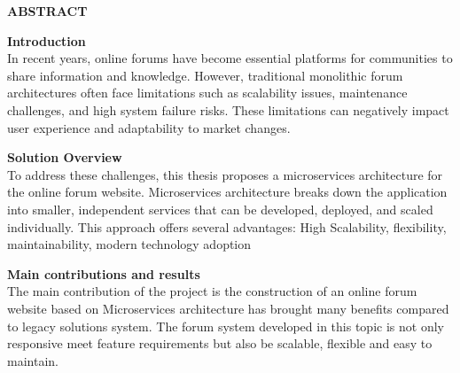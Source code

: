 \documentclass[../index.tex]{subfiles}
\begin{document}
    \newpage
    \begin{center}
        \Large{\textbf{ABSTRACT}}\\
    \end{center}
    \vspace{1cm}

    \textbf{Introduction}\\
    \indent
    In recent years, online forums have become essential platforms for communities
    to share information and knowledge. However, traditional monolithic forum architectures
    often face limitations such as scalability issues, maintenance challenges, and
    high system failure risks. These limitations can negatively impact user
    experience and adaptability to market changes.

    \textbf{Solution Overview}\\
    \indent
    To address these challenges, this thesis proposes a microservices architecture
    for the online forum website. Microservices architecture breaks down the
    application into smaller, independent services that can be developed,
    deployed, and scaled individually. This approach offers several advantages: High
    Scalability, flexibility, maintainability, modern technology adoption

    \textbf{Main contributions and results}\\
    \indent
    The main contribution of the project is the construction of an online forum website
    based on Microservices architecture has brought many benefits compared to legacy
    solutions system. The forum system developed in this topic is not only
    responsive meet feature requirements but also be scalable, flexible and easy
    to maintain.
\end{document}
